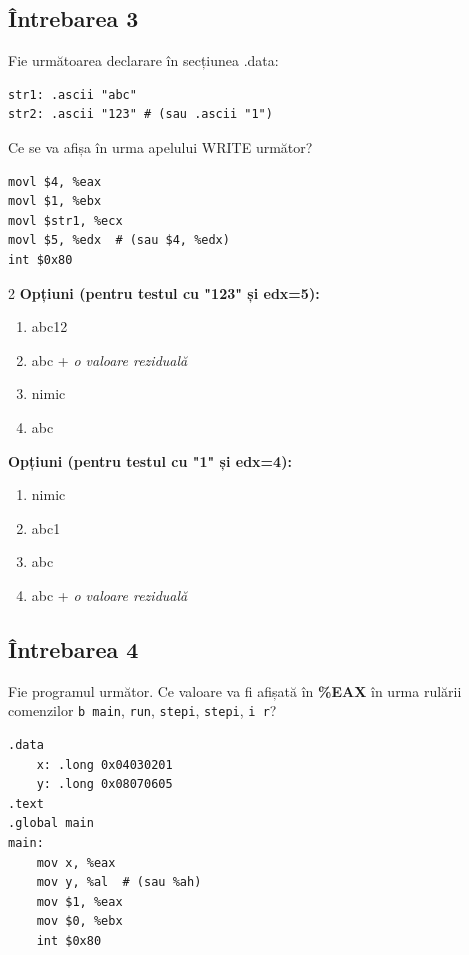 \documentclass[12pt,a4paper]{article}
\begin{document}
\subsection*{Întrebarea 3}
Fie următoarea declarare în secțiunea .data:
\begin{lstlisting}[language=x86asm]
str1: .ascii "abc"
str2: .ascii "123" # (sau .ascii "1")
\end{lstlisting}


Ce se va afișa în urma apelului WRITE următor?
\begin{lstlisting}[language=x86asm]
movl $4, %eax
movl $1, %ebx
movl $str1, %ecx
movl $5, %edx  # (sau $4, %edx)
int $0x80
\end{lstlisting}

\begin{multicols}{2}
\textbf{Opțiuni (pentru testul cu "123" și edx=5):}
\begin{enumerate}[label=\alph*)]
    \item abc12 
    \item abc + \textit{o valoare reziduală}
    \item nimic
    \item abc
\end{enumerate}

\textbf{Opțiuni (pentru testul cu "1" și edx=4):}
\begin{enumerate}[label=\alph*)]
    \item nimic
    \item abc1 
    \item abc
    \item abc + \textit{o valoare reziduală}
\end{enumerate}
\end{multicols}

\subsection*{Întrebarea 4}
Fie programul următor. Ce valoare va fi afișată în \textbf{\%EAX} în urma rulării comenzilor \texttt{b main}, \texttt{run}, \texttt{stepi}, \texttt{stepi}, \texttt{i r}?

\begin{lstlisting}[language=x86asm]
.data
    x: .long 0x04030201
    y: .long 0x08070605
.text
.global main
main:
    mov x, %eax
    mov y, %al  # (sau %ah)
    mov $1, %eax
    mov $0, %ebx
    int $0x80
\end{lstlisting}
\end{document}
